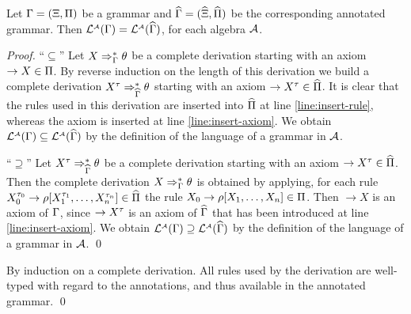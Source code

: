 \ifLongVersion\else
\begin{textAtEnd}[category=initial]
\fi
\begin{lemma}\label{lemma:annotation}
  Let $\Gamma=(\Xi,\Pi)$ be a grammar and
  $\widehat{\Gamma}=(\widehat{\Xi},\widehat{\Pi})$ be the
  corresponding annotated grammar. Then
  $\mathcal{L}_{}^{\scriptscriptstyle{\mathcal{A}}}({\Gamma}) =
  \mathcal{L}_{}^{\scriptscriptstyle{\mathcal{A}}}({\widehat{\Gamma}})$, for each
  \hrtext{} algebra $\mathcal{A}$.
\end{lemma}
\begin{proof}
  ``$\subseteq$'' Let $X \Rightarrow_{\Gamma}^* \theta$ be a complete
  derivation starting with an axiom $\rightarrow X \in \Pi$. By
  reverse induction on the length of this derivation we build a
  complete derivation $X^\tau \Rightarrow_{\widehat{\Gamma}}^* \theta$
  starting with an axiom $\rightarrow X^\tau \in
  \widehat{\Pi}$. It is clear that the rules used in this
  derivation are inserted into $\widehat{\Pi}$ at line
  \ref{line:insert-rule}, whereas the axiom is inserted at line
  \ref{line:insert-axiom}. We obtain $\mathcal{L}_{}^{\scriptscriptstyle{\mathcal{A}}}({\Gamma})
  \subseteq \mathcal{L}_{}^{\scriptscriptstyle{\mathcal{A}}}({\widehat{\Gamma}})$ by the
  definition of the language of a grammar in $\mathcal{A}$. 

  \noindent``$\supseteq$'' Let $X^\tau \Rightarrow_{\widehat{\Gamma}}^*
  \theta$ be a complete derivation starting with an axiom $\rightarrow
  X^\tau \in \widehat{\Pi}$. Then the complete derivation $X
  \Rightarrow_{\Gamma}^* \theta$ is obtained by applying, for each rule
  $X_0^{\tau_0} \rightarrow \rho[X_1^{\tau_1}, \ldots,
    X_n^{\tau_n}] \in \widehat{\Pi}$ the rule $X_0 \rightarrow
  \rho[X_1,\ldots,X_n] \in \Pi$. Then $\rightarrow X$ is an axiom
  of $\Gamma$, since $\rightarrow X^\tau$ is an axiom of
  $\widehat{\Gamma}$ that has been introduced at line
  \ref{line:insert-axiom}. We obtain $\mathcal{L}_{}^{\scriptscriptstyle{\mathcal{A}}}({\Gamma})
  \supseteq \mathcal{L}_{}^{\scriptscriptstyle{\mathcal{A}}}({\widehat{\Gamma}})$ by the
  definition of the language of a grammar in $\mathcal{A}$. \qed
\end{proof}
\begin{proofSketch}
  By induction on a complete derivation.
  All rules used by the derivation
  are well-typed with regard to the annotations,
  and thus available in the annotated grammar.
  \qed
\end{proofSketch}


\end{textAtEnd}

